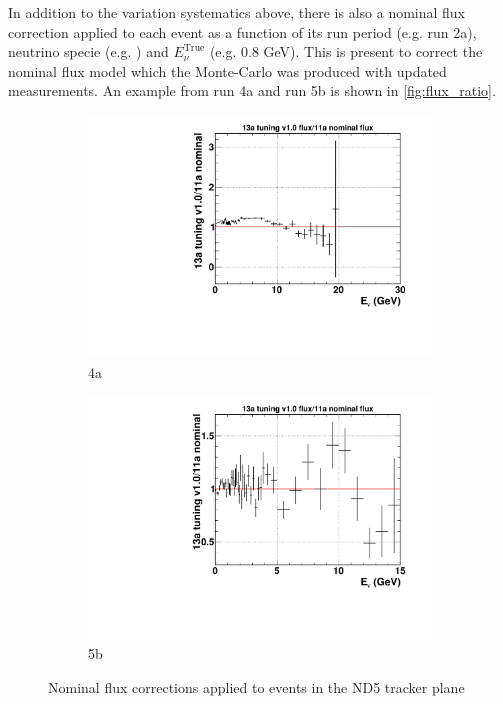 
In addition to the variation systematics above, there is also a nominal flux correction applied to each event as a function of its run period (e.g. run 2a), neutrino specie (e.g. \numubar) and $E_\nu^{\text{True}}$ (e.g. 0.8 GeV). This is present to correct the nominal flux model which the Monte-Carlo was produced with updated measurements. An example from run 4a and run 5b is shown in \autoref{fig:flux_ratio}.
\begin{figure}[h]
	\begin{subfigure}[t]{0.42\textwidth}
		\includegraphics[width=\textwidth, trim={0mm 0mm 0mm 0mm}, clip,page=1]{figures/flux/run4_enu_nd5_13av2_numu_rat}
		\caption{4a \numu}
	\end{subfigure}
	\begin{subfigure}[t]{0.42\textwidth}
		\includegraphics[width=\textwidth, trim={0mm 0mm 0mm 0mm}, clip,page=1]{figures/flux/run5b_enu_nd5_13av2_numubar_rat}
		\caption{5b \numubar}
	\end{subfigure}
	\caption{Nominal flux corrections applied to events in the ND5 tracker plane}
	\label{fig:flux_ratio}
\end{figure}

